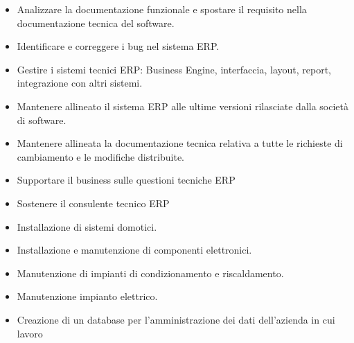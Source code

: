 \documentclass[10pt,a4paper]{altacv}
\begin{document}
\begin{itemize}
\item Analizzare la documentazione funzionale e spostare il requisito nella documentazione tecnica del software.
\item Identificare e correggere i bug nel sistema ERP.
\item Gestire i sistemi tecnici ERP: Business Engine, interfaccia, layout, report, integrazione con altri sistemi.
\item Mantenere allineato il sistema ERP alle ultime versioni rilasciate dalla società di software.
\item Mantenere allineata la documentazione tecnica relativa a tutte le richieste di cambiamento e le modifiche distribuite.
\item Supportare il business sulle questioni tecniche ERP
\item Sostenere il consulente tecnico ERP
\end{itemize}

\divider



\begin{itemize}
\item Installazione di sistemi domotici.
\item Installazione e manutenzione di componenti elettronici.
\item  Manutenzione di impianti di condizionamento e riscaldamento.
\item Manutenzione impianto elettrico.
\item Creazione di un database per l’amministrazione dei dati dell’azienda in cui lavoro
\end{itemize}


\end{document}

